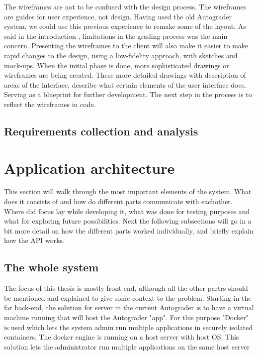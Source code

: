 The wireframes are not to be confused with the design process. The wireframes are guides for user experience, not design. Having used the old Autograder system, we could use this previous experience to remake some of the layout. As said in the introduction , limitations in the grading process was the main concern. Presenting the wireframes to the client will also make it easier to make rapid changes to the design, using a low-fidelity approach, with sketches and mock-ups. When the initial phase is done, more sophisticated drawings or wireframes are being created. These more detailed drawings with description of areas of the interface, describe what certain elements of the user interface does. Serving as a blueprint for further development. The next step in the process is to reflect the wireframes in code.

\subsection{Requirements collection and analysis}

\section{Application architecture}
This section will walk through the most important elements of the system. What does it consists of and how do different parts communicate with eachother. Where did focus lay while developing it, what was done for testing purposes and what for exploring future possibilities. Next the following subsections will go in a bit more detail on how the different parts worked individually, and briefly explain how the API works.

\subsection{The whole system}
The focus of this thesis is mostly front-end, although all the other partrs should be mentioned and explained to give some context to the problem. Starting in the far back-end, the solution for server in the current Autograder is to have a virtual machine running that will host the Autograder "app". For this purpose "Docker" is used which lets the system admin run multiple applications in securely isolated containers. The docker engine is running on a host server with host OS. This solution lets the administrator run multiple applications on the same host server

